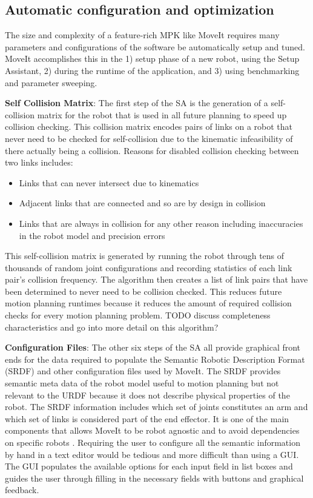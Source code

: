 \documentclass[10pt,journal,compsoc]{joser1}
\begin{document}
{%
\subsection{Automatic configuration and optimization}

The size and complexity of a feature-rich MPK like MoveIt requires many parameters and configurations of the software be automatically setup and tuned. MoveIt accomplishes this in the 1) setup phase of a new robot, using the Setup Assistant, 2) during the runtime of the application, and 3) using benchmarking and parameter sweeping.

{\bf Self Collision Matrix}: The first step of the SA is the generation of a self-collision matrix for the robot that is used in all future planning to speed up collision checking. This collision matrix encodes pairs of links on a robot that never need to be checked for self-collision due to the kinematic infeasibility of there actually being a collision. Reasons for disabled collision checking between two links includes:
 
\begin{itemize}
    \item Links that can never intersect due to kinematics
    \item Adjacent links that are connected and so are by design in collision
    \item Links that are always in collision for any other reason including inaccuracies in the robot model and precision errors
\end{itemize}

This self-collision matrix is generated by running the robot through tens of thousands of random joint configurations and recording statistics of each link pair's collision frequency. The algorithm then creates a list of link pairs that have been determined to never need to be collision checked. This reduces future motion planning runtimes because it reduces the amount of required collision checks for every motion planning problem. TODO discuss completeness characteristics and go into more detail on this algorithm?

{\bf Configuration Files}: The other six steps of the SA all provide graphical front ends for the data required to populate the Semantic Robotic Description Format (SRDF) and other configuration files used by MoveIt. The SRDF provides semantic meta data of the robot model useful to motion planning but not relevant to the URDF because it does not describe physical properties of the robot. The SRDF information includes which set of joints constitutes an arm and which set of links is considered part of the end effector. It is one of the main components that allows MoveIt to be robot agnostic and to avoid dependencies on specific robots \cite{moveit}. Requiring the user to configure all the semantic information by hand in a text editor would be tedious and more difficult than using a GUI. The GUI populates the available options for each input field in list boxes and guides the user through filling in the necessary fields with buttons and graphical feedback.

}
\end{document}
